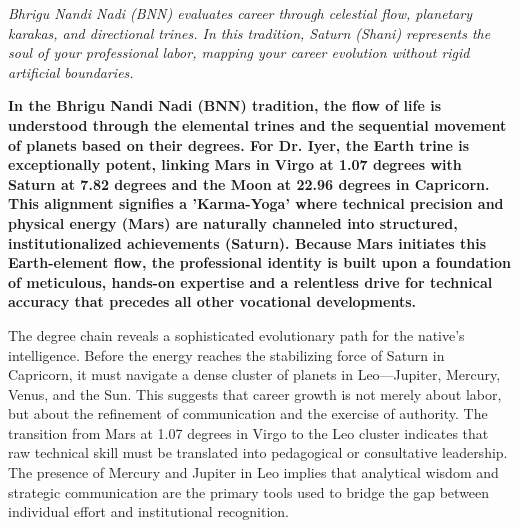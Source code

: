 


{\fontsize{9.5}{14}\selectfont\color{DeepSlate}\itshape Bhrigu Nandi Nadi (BNN) evaluates career through celestial flow, planetary karakas, and directional trines. In this tradition, Saturn (Shani) represents the soul of your professional labor, mapping your career evolution without rigid artificial boundaries.}\par\vspace{3.5mm}

\label{topic32}

{\fontsize{9.5}{13.8}\selectfont\bfseries\color{DeepSlate} In the Bhrigu Nandi Nadi (BNN) tradition, the flow of life is understood through the elemental trines and the sequential movement of planets based on their degrees. For Dr. Iyer, the Earth trine is exceptionally potent, linking Mars in Virgo at 1.07 degrees with Saturn at 7.82 degrees and the Moon at 22.96 degrees in Capricorn. This alignment signifies a 'Karma-Yoga' where technical precision and physical energy (Mars) are naturally channeled into structured, institutionalized achievements (Saturn). Because Mars initiates this Earth-element flow, the professional identity is built upon a foundation of meticulous, hands-on expertise and a relentless drive for technical accuracy that precedes all other vocational developments.}\par\vspace{2mm}

{\fontsize{9}{13}\selectfont The degree chain reveals a sophisticated evolutionary path for the native's intelligence. Before the energy reaches the stabilizing force of Saturn in Capricorn, it must navigate a dense cluster of planets in Leo---Jupiter, Mercury, Venus, and the Sun. This suggests that career growth is not merely about labor, but about the refinement of communication and the exercise of authority. The transition from Mars at 1.07 degrees in Virgo to the Leo cluster indicates that raw technical skill must be translated into pedagogical or consultative leadership. The presence of Mercury and Jupiter in Leo implies that analytical wisdom and strategic communication are the primary tools used to bridge the gap between individual effort and institutional recognition.}\par\vspace{1.8mm}

